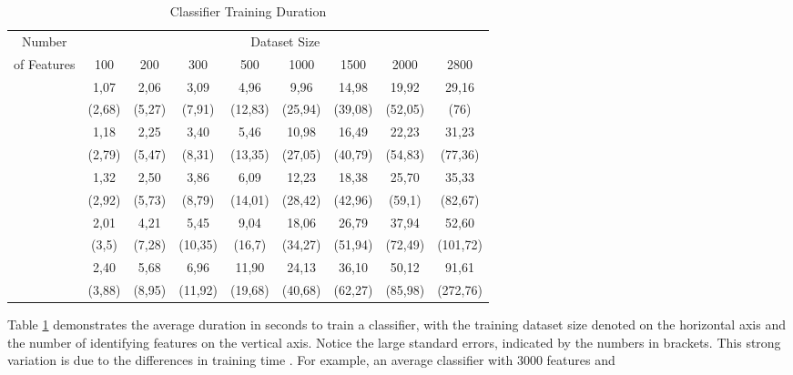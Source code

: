 			
			\begin{table}[h]
				\hskip-0.4cm
				\footnotesize	
					\begin{tabular}{c| c c c c c c c c} 
						\hline \hline
						 Number & \multicolumn{8}{c}{Dataset Size} \\
						 \cline{2-9}
						 of Features & 100 &  200 &  300  & 500  & 1000 & 1500 & 2000 & 2800\\ 
						\hline
						\vspace*{-2mm} 
						\multirow{2}{*}{100} & 1,07  & 2,06  & 3,09 	& 4,96  & 9,96  & 14,98 & 19,92 & 29,16  \\
										  	 &(2,68) & (5,27)&(7,91)	&(12,83)&(25,94)&(39,08)&(52,05)&(76)    \\
						\vspace*{-2mm} 
						\multirow{2}{*}{500} & 1,18  & 2,25  & 3,40 	&	5,46& 10,98 & 16,49 & 22,23 & 31,23  \\
						 	      			 & (2,79)& (5,47)&(8,31)	&(13,35)&(27,05)&(40,79)&(54,83)&(77,36) \\
						\vspace*{-2mm} 
						\multirow{2}{*}{1000}& 1,32  & 2,50	 & 3,86 	& 6,09 	& 12,23 & 18,38 & 25,70 & 35,33  \\
							      			 & (2,92)& (5,73)&(8,79)	&(14,01)&(28,42)&(42,96)&(59,1) &(82,67) \\
						\vspace*{-2mm} 
						\multirow{2}{*}{3000}& 2,01	 & 4,21  & 5,45	    & 9,04  & 18,06 & 26,79 & 37,94 & 52,60  \\
							     			 &(3,5)  &(7,28) &(10,35)   &(16,7) &(34,27)&(51,94)&(72,49)&(101,72)\\
						\vspace*{-2mm} 
						\multirow{2}{*}{5000}& 2,40	 & 5,68	 & 6,96	    & 11,90 & 24,13 & 36,10 &50,12	& 91,61   \\
							      			 & (3,88)&(8,95) &(11,92)   &(19,68)&(40,68)&(62,27)&(85,98)&(272,76)\\
						\hline
						\hline
					\end{tabular}
				\caption[Classifier Duration]{Classifier Training Duration}
				\label{table:class_duration}
			\end{table}
		
		Table \ref{table:class_duration} demonstrates the average duration in seconds to train a classifier, with the training dataset size denoted on the horizontal axis and the number of identifying features on the vertical axis. Notice the large standard errors, indicated by the numbers in brackets. This strong variation is due to the differences in training time . For example, an average classifier with 3000 features and 
				
